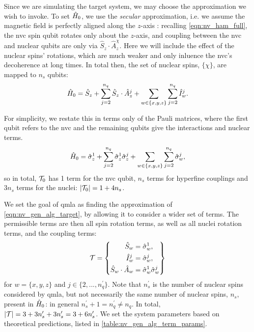 Since we are simulating the target system, we may choose the approximation we wish to invoke. 
To set $\hat{H}_0$, we use the \emph{secular} approximation, i.e. we assume the magnetic field is perfectly aligned along 
    the $z$-axis \cite{rowan1965electron}:
    recalling \cref{eqn:nv_ham_full}, the \gls{nvc} spin qubit rotates only about the $z$-axis, 
    and coupling between the \gls{nvc} and nuclear qubits are only via $\hat{S}_z \cdot \hat{A}_z^{\chi}$.
Here we will include the effect of the nuclear spins' rotations, which are much weaker and only inluence the \gls{nvc}'s decoherence at long times. 
In total then, the set of nuclear spins, $\{\chi\}$, are mapped to $n_s$ qubits:
\begin{equation}
    \hat{H}_0 = \hat{S}_z 
    + \sum\limits_{ j=2 }^{n_q} \hat{S}_z \cdot \hat{A}_z^{j} 
    + \sum\limits_{w \in \{x,y,z\}} \sum\limits_{ j=2 }^{n_q} \hat{I}_w^{j}.
\end{equation}

For simplicity, we restate this in terms only of the Pauli matrices,
    where the first qubit refers to the \gls{nvc} and the remaining qubits give the interactions and nuclear terms.
\begin{equation}
    \label{eqn:nv_gen_alg_target}
    \hat{H}_0 = \hat{\sigma}_{z}^1 
    + \sum\limits_{ j=2 }^{n_q} \hat{\sigma}_{z}^1 \hat{\sigma}_{z}^j 
    + \sum\limits_{w \in \{x,y,z\}} \sum\limits_{ j=2 }^{n_q} \hat{\sigma}_w^j,
\end{equation}
    so in total, $\mathcal{T}_0$ has 1 term for the \gls{nvc} qubit, $n_s$ terms for hyperfine couplings
    and $3n_s$ terms for the nuclei: $\left\lvert \mathcal{T}_0 \right\rvert = 1 + 4n_s$.
\par 

We set the goal of \gls{qmla} as finding the approximation of \cref{eqn:nv_gen_alg_target},
    by allowing it to consider a wider set of terms. 
The permissible terms are then all spin rotation terms, 
    as well as all nuclei rotation terms, and the coupling terms:
\begin{equation}
    \mathcal{T} = \left\{ 
        \begin{split}    
            \hat{S}_w &= \hat{\sigma}_w^{1}, \\
            \hat{I}_w^{j} &= \hat{\sigma}_w^{j}, \\
            \hat{S}_w \cdot \hat{A}_w &= \hat{\sigma}_w^1 \hat{\sigma}_w^j
        \end{split}
    \right\}
    \label{eqn:nv_ga_terms}
\end{equation}
    for $w=\{ x, y, z \}$ and $j \in \{ 2, ..., n_q^{\prime} \}$.
Note that $n_s^{\prime}$ is the number of nuclear spins considered by \gls{qmla}, but not necessarily the 
    same number of nuclear spins, $n_s$, present in $\hat{H}_0$:
    in general $n_s^{\prime}+1 = n_q^{\prime} \neq n_q$.
In total, $\left\lvert \mathcal{T} \right\rvert = 3 + 3n_s^{\prime} + 3 n_s^{\prime} = 3 + 6 n_s^{\prime}$. 
We set the system parameters based on theoretical predictions, listed in \cref{table:nv_gen_alg_term_params}.

